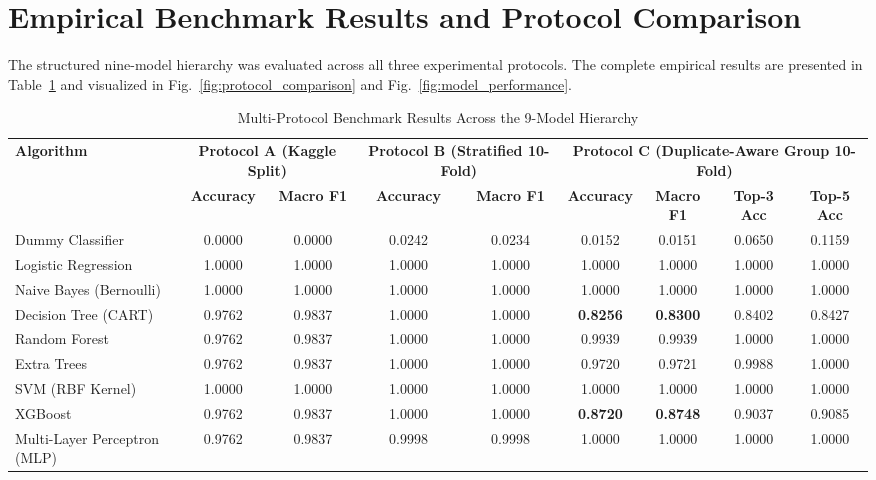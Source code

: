 \section{Empirical Benchmark Results and Protocol Comparison}
\label{sec:benchmark_results}

The structured nine-model hierarchy was evaluated across all three experimental protocols. The complete empirical results are presented in Table~\ref{tab:protocol_benchmark_results} and visualized in Fig.~\ref{fig:protocol_comparison} and Fig.~\ref{fig:model_performance}.

\begin{table}[!t]
\caption{Multi-Protocol Benchmark Results Across the 9-Model Hierarchy}
\label{tab:protocol_benchmark_results}
\centering
\begin{tabular}{l|cc|cc|cccc}
\toprule
\multirow{2}{*}{\textbf{Algorithm}} & \multicolumn{2}{c|}{\textbf{Protocol A (Kaggle Split)}} & \multicolumn{2}{c|}{\textbf{Protocol B (Stratified 10-Fold)}} & \multicolumn{4}{c}{\textbf{Protocol C (Duplicate-Aware Group 10-Fold)}} \\
\cmidrule{2-9}
& \textbf{Accuracy} & \textbf{Macro F1} & \textbf{Accuracy} & \textbf{Macro F1} & \textbf{Accuracy} & \textbf{Macro F1} & \textbf{Top-3 Acc} & \textbf{Top-5 Acc} \\
\midrule
Dummy Classifier & 0.0000 & 0.0000 & 0.0242 & 0.0234 & 0.0152 & 0.0151 & 0.0650 & 0.1159 \\
Logistic Regression & 1.0000 & 1.0000 & 1.0000 & 1.0000 & 1.0000 & 1.0000 & 1.0000 & 1.0000 \\
Naive Bayes (Bernoulli) & 1.0000 & 1.0000 & 1.0000 & 1.0000 & 1.0000 & 1.0000 & 1.0000 & 1.0000 \\
Decision Tree (CART) & 0.9762 & 0.9837 & 1.0000 & 1.0000 & \textbf{0.8256} & \textbf{0.8300} & 0.8402 & 0.8427 \\
Random Forest & 0.9762 & 0.9837 & 1.0000 & 1.0000 & 0.9939 & 0.9939 & 1.0000 & 1.0000 \\
Extra Trees & 0.9762 & 0.9837 & 1.0000 & 1.0000 & 0.9720 & 0.9721 & 0.9988 & 1.0000 \\
SVM (RBF Kernel) & 1.0000 & 1.0000 & 1.0000 & 1.0000 & 1.0000 & 1.0000 & 1.0000 & 1.0000 \\
XGBoost & 0.9762 & 0.9837 & 1.0000 & 1.0000 & \textbf{0.8720} & \textbf{0.8748} & 0.9037 & 0.9085 \\
Multi-Layer Perceptron (MLP) & 0.9762 & 0.9837 & 0.9998 & 0.9998 & 1.0000 & 1.0000 & 1.0000 & 1.0000 \\
\bottomrule
\end{tabular}
\end{table}


